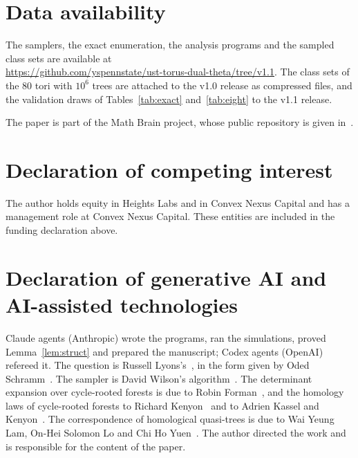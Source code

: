 \documentclass[11pt]{amsart}
\theoremstyle{definition}
\theoremstyle{remark}
\begin{document}
\section*{Data availability}
The samplers, the exact enumeration, the analysis programs and the sampled class sets are available at\\
\url{https://github.com/yspennstate/ust-torus-dual-theta/tree/v1.1}.
The class sets of the $80$ tori with $10^6$ trees are attached to the v1.0 release as compressed files, and the
validation draws of Tables~\ref{tab:exact} and~\ref{tab:eight} to the v1.1 release.

The paper is part of the Math Brain project, whose public repository is given in~\cite{MathBrainRepo}.

\section*{Declaration of competing interest}
The author holds equity in Heights Labs and in Convex Nexus Capital and has a management role at Convex Nexus Capital.
These entities are included in the funding declaration above.

\section*{Declaration of generative AI and AI-assisted technologies}
Claude agents (Anthropic) wrote the programs, ran the simulations, proved Lemma~\ref{lem:struct} and prepared the
manuscript; Codex agents (OpenAI) refereed it. The question is Russell Lyons's~\cite{Ly03}, in the form given by Oded
Schramm~\cite{Sch07}. The sampler is David Wilson's algorithm~\cite{Wil96}. The determinant expansion over cycle-rooted
forests is due to Robin Forman~\cite{For93}, and the homology laws of cycle-rooted forests to Richard
Kenyon~\cite{Ken11} and to Adrien Kassel and Kenyon~\cite{KK17}. The correspondence of homological quasi-trees is due to
Wai Yeung Lam, On-Hei Solomon Lo and Chi Ho Yuen~\cite{LLY26}. The author directed the work and is responsible for the content
of the paper.
\end{document}
